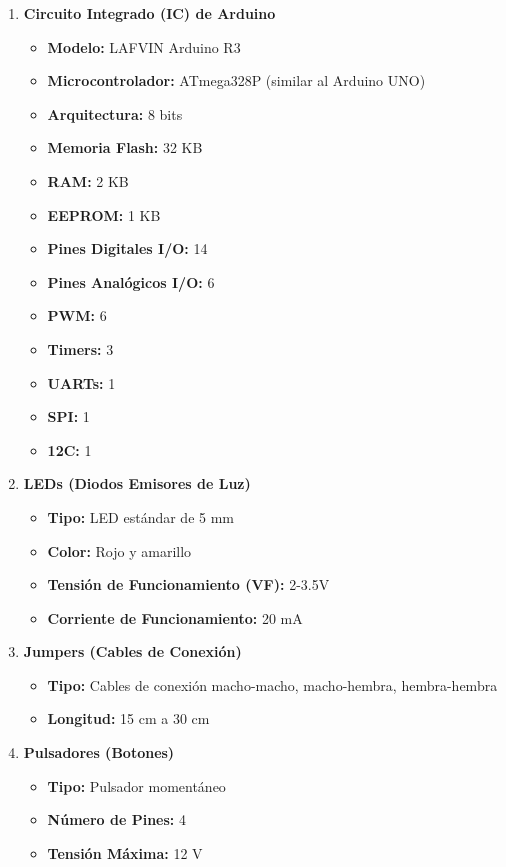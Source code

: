 \begin{enumerate}
  \item \textbf{Circuito Integrado (IC) de Arduino}
  \begin{itemize}
    \item \textbf{Modelo:} LAFVIN Arduino R3
    \item \textbf{Microcontrolador:} ATmega328P (similar al Arduino UNO)
    \item \textbf{Arquitectura:} 8 bits
    \item \textbf{Memoria Flash:} 32 KB 
    \item \textbf{RAM:} 2 KB 
    \item \textbf{EEPROM:} 1 KB 
    \item \textbf{Pines Digitales I/O:} 14 
    \item \textbf{Pines Analógicos I/O:} 6
    \item \textbf{PWM:} 6 
    \item \textbf{Timers:} 3 
    \item \textbf{UARTs:} 1 
    \item \textbf{SPI:} 1
    \item \textbf{12C:} 1
  \end{itemize}
  \item \textbf{LEDs (Diodos Emisores de Luz)}
  \begin{itemize}
    \item \textbf{Tipo:} LED estándar de 5 mm
    \item \textbf{Color:} Rojo y amarillo
    \item \textbf{Tensión de Funcionamiento (VF):} 2-3.5V
    \item \textbf{Corriente de Funcionamiento:} 20 mA
  \end{itemize}
  \item \textbf{Jumpers (Cables de Conexión)}
  \begin{itemize}
    \item \textbf{Tipo:} Cables de conexión macho-macho, macho-hembra, hembra-hembra
    \item \textbf{Longitud:} 15 cm a 30 cm
  \end{itemize}
  \item \textbf{Pulsadores (Botones)}
  \begin{itemize}
    \item \textbf{Tipo:} Pulsador momentáneo
    \item \textbf{Número de Pines:} 4
    \item \textbf{Tensión Máxima:} 12 V

\end{itemize}
\end{enumerate}
